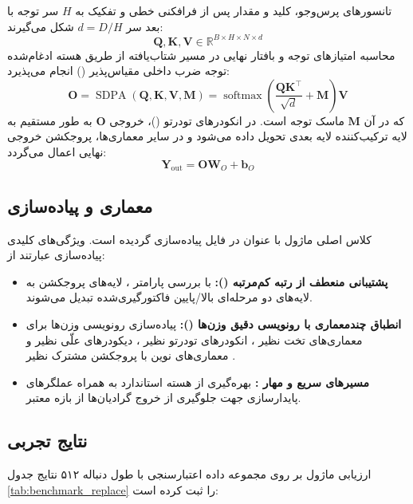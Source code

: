 تانسورهای پرس‌وجو، کلید و مقدار پس از فرافکنی خطی و تفکیک به $H$ سر توجه با بعد سر $d = D/H$ شکل می‌گیرند:
\begin{equation}
\mathbf{Q}, \mathbf{K}, \mathbf{V} \in \mathbb{R}^{B \times H \times N \times d}
\end{equation}
محاسبه امتیازهای توجه و بافتار نهایی در مسیر شتاب‌یافته از طریق هسته ادغام‌شده توجه ضرب داخلی مقیاس‌پذیر () انجام می‌پذیرد:
\begin{equation}
\mathbf{O} = \operatorname{SDPA}(\mathbf{Q}, \mathbf{K}, \mathbf{V}, \mathbf{M}) = \operatorname{softmax}\left(\frac{\mathbf{Q} \mathbf{K}^\top}{\sqrt{d}} + \mathbf{M}\right) \mathbf{V}
\end{equation}
که در آن $\mathbf{M}$ ماسک توجه است. در انکودرهای تودرتو ()، خروجی $\mathbf{O}$ به طور مستقیم به لایه ترکیب‌کننده لایه بعدی تحویل داده می‌شود و در سایر معماری‌ها، پروجکشن خروجی نهایی اعمال می‌گردد:
\begin{equation}
\mathbf{Y}_{\text{out}} = \mathbf{O} \mathbf{W}_O + \mathbf{b}_O
\end{equation}

\subsection{معماری و پیاده‌سازی}
کلاس اصلی ماژول با عنوان  در فایل  پیاده‌سازی گردیده است. ویژگی‌های کلیدی پیاده‌سازی عبارتند از:
\begin{itemize}
    \item \textbf{پشتیبانی منعطف از رتبه کم‌مرتبه ():} با بررسی پارامتر ، لایه‌های پروجکشن به لایه‌های دو مرحله‌ای بالا/پایین فاکتورگیری‌شده تبدیل می‌شوند.
    \item \textbf{انطباق چندمعماری با رونویسی دقیق وزن‌ها ():} پیاده‌سازی رونویسی وزن‌ها برای معماری‌های تخت نظیر ، انکودرهای تودرتو نظیر ، دیکودرهای علّی نظیر  و معماری‌های نوین با پروجکشن مشترک نظیر .
    \item \textbf{مسیرهای سریع  و مهار :} بهره‌گیری از هسته استاندارد  به همراه عملگرهای پایدارسازی  جهت جلوگیری از خروج گرادیان‌ها از بازه معتبر.
\end{itemize}

\subsection{نتایج تجربی}
ارزیابی ماژول  بر روی مجموعه داده اعتبارسنجی  با طول دنباله ۵۱۲ نتایج جدول \ref{tab:benchmark_replace} را ثبت کرده است:

